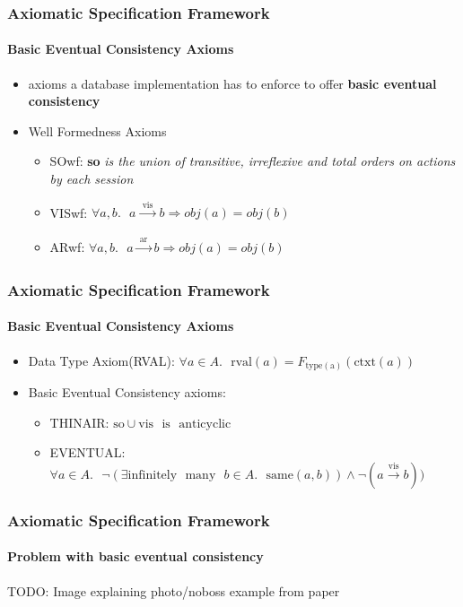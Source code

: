 \documentclass[11pt]{beamer}
\begin{document}
\begin{frame}
\frametitle{Axiomatic Specification Framework}
\framesubtitle{Basic Eventual Consistency Axioms}
\begin{itemize}
\item axioms a database implementation has to enforce to offer \textbf{basic eventual consistency} 
\item Well Formedness Axioms
\begin{itemize}
\item SOwf: \textbf{so} \textit{is the union of transitive, irreflexive and total orders
on actions by each session}
\item VISwf: \(\forall a,b. \text{ } a \xrightarrow[]{\text{ vis }}b \Rightarrow obj(a) = obj(b) \)
\item ARwf: \(\forall a,b. \text{ } a \xrightarrow[]{\text{ ar }} b \Rightarrow obj(a) = obj(b) \)
\end{itemize}
\end{itemize}
\end{frame}

\begin{frame}
\frametitle{Axiomatic Specification Framework}
\framesubtitle{Basic Eventual Consistency Axioms}
\begin{itemize}
\item Data Type Axiom(RVAL): \linebreak \(\forall a \in A. \text{ } \mathrm{rval}(a) = F \mathrm{_{type(a)}} (\mathrm{ctxt}(a))\)
\item Basic Eventual Consistency axioms:
\begin{itemize}
\item THINAIR: \linebreak \(\mathrm{so} \cup \mathrm{vis} \text{ } \mathrm{is} \text{ } \mathrm{anticyclic} \) 
\item EVENTUAL: \linebreak \(\forall a \in A. \text{ } \neg(\exists \mathrm{infinitely} \text{ } \mathrm{many} \text{ } b  \in A. \text{ } \mathrm{same}(a,b)) \wedge \neg(a \xrightarrow[]{\text{vis}} b)) \)
\end{itemize}
\end{itemize}
\end{frame}

\begin{frame}
\frametitle{Axiomatic Specification Framework}
\framesubtitle{Problem with basic eventual consistency}
TODO: Image explaining photo/noboss example from paper
\end{frame}
\end{document}
